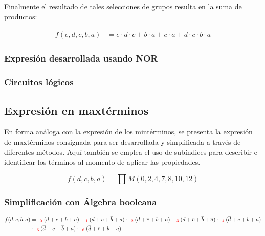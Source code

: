 Finalmente el resultado de tales selecciones de grupos resulta en la suma de productos:

\begin{equation*}
\begin{align*}
f(e,d,c,b,a) & = {e \cdot d \cdot \overline{c}}
+ {\overline{b} \cdot \overline{a}}
+ {\overline{c} \cdot \overline{a}}
+ {\overline{d} \cdot c \cdot b \cdot a}
\end{align*}
\end{equation*}

\subsubsection{Expresión desarrollada usando NOR}

\subsubsection{Circuitos lógicos}

\subsection{Expresi\'on en maxt\'erminos}
En forma an\'aloga con la expresi\'on de los mint\'erminos, se presenta la expresi\'on de maxt\'erminos consignada para ser
desarrollada y simplificada a trav\'es de diferentes m\'etodos. Aqu\'i tambi\'en se emplea el uso de sub\'indices para describir
e identificar los t\'erminos al momento de aplicar las propiedades.

\begin{equation*}
    f(d,c,b,a) = \prod M(0,2,4,7,8,10,12)
\end{equation*}

\subsubsection{Simplificación con Álgebra booleana}

\begin{equation*}
\begin{align*}
f(d,c,b,a) & = _{\ \ \color{red} 0} {(d+c+b+a)}
\cdot _{\ \ \color{red} 1} {(d+c+\overline{b}+a)}
\cdot _{\ \ \color{red} 2} {(d+\overline{c}+b+a)}
\cdot _{\ \ \color{red} 3} {(d+\overline{c}+\overline{b}+\overline{a})}
\cdot _{\ \ \color{red} 4} {(\overline{d}+c+b+a)} \\
& \cdot _{\ \ \color{red} 5} {(\overline{d}+c+\overline{b}+a)}
\cdot _{\ \ \color{red} 6} {(\overline{d}+\overline{c}+b+a)}
\end{align*}
\end{equation*}

